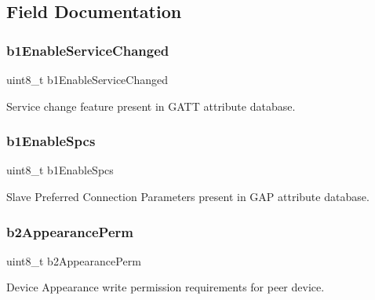 \subsection{Field Documentation}
\mbox{\label{structat__ble__att__cfg__t_ae80850235515b7cd4da4ce3d4f25b851}} 
\subsubsection{\texorpdfstring{b1EnableServiceChanged}{b1EnableServiceChanged}}
{\footnotesize\ttfamily uint8\+\_\+t b1\+Enable\+Service\+Changed}



Service change feature present in G\+A\+TT attribute database. 

\mbox{\label{structat__ble__att__cfg__t_af6ff5d732db0289661e56ce65bfab35d}} 
\subsubsection{\texorpdfstring{b1EnableSpcs}{b1EnableSpcs}}
{\footnotesize\ttfamily uint8\+\_\+t b1\+Enable\+Spcs}



Slave Preferred Connection Parameters present in G\+AP attribute database. 

\mbox{\label{structat__ble__att__cfg__t_aad9368e69f65d212ce361dd716d85a96}} 
\subsubsection{\texorpdfstring{b2AppearancePerm}{b2AppearancePerm}}
{\footnotesize\ttfamily uint8\+\_\+t b2\+Appearance\+Perm}



Device Appearance write permission requirements for peer device. 

